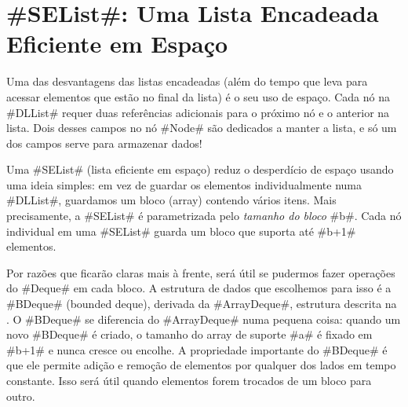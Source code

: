 \section{#SEList#: Uma Lista Encadeada Eficiente em Espaço}

%
%
Uma das desvantagens das listas encadeadas (além do tempo que leva para acessar
elementos que estão no final da lista) é o seu uso de espaço.  Cada nó
na #DLList# requer duas referências adicionais para o próximo nó
e o anterior na lista.  Dois desses campos no nó #Node# são dedicados
a manter a lista, e só um dos campos serve para armazenar dados!

Uma #SEList# (lista eficiente em espaço) reduz o desperdício de espaço usando
uma ideia simples: em vez de guardar os elementos individualmente numa #DLList#,
guardamos um bloco (array) contendo vários itens. Mais precisamente, a
#SEList# é parametrizada pelo \emph{tamanho do bloco} #b#. Cada nó individual
em uma #SEList# guarda um bloco que suporta até #b+1# elementos.

Por razões que ficarão claras mais à frente, será útil se pudermos fazer 
operações do #Deque# em cada bloco.  A estrutura de dados que escolhemos
para isso é a #BDeque# (bounded deque),
%
%
%
derivada da #ArrayDeque#,
estrutura descrita na .  O #BDeque# se diferencia do
#ArrayDeque# numa pequena coisa: quando um novo #BDeque# é criado, o tamanho
do array de suporte #a# é fixado em #b+1# e nunca cresce ou encolhe.
A propriedade importante do #BDeque# é que ele permite adição e remoção
de elementos por qualquer dos lados em tempo constante. Isso
será útil quando elementos forem trocados de um bloco para outro.




